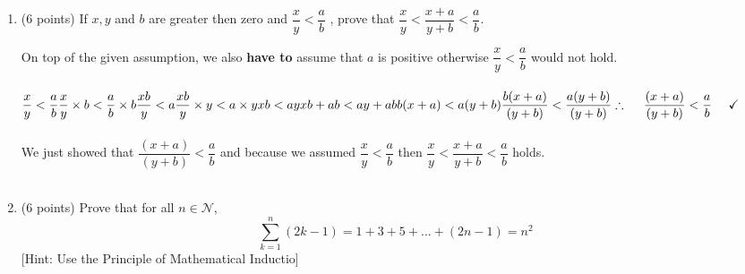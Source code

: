 \documentclass[fleqn]{article}
\begin{document}
  \begin{enumerate}
    \item (6 points)  If $x, y$ and $b$ are greater then zero and $\dfrac{x}{y}<\dfrac{a}{b}$
    , prove that $\dfrac{x}{y} < \dfrac{x+a}{y+b} < \dfrac{a}{b}$.

      \textcolor{hwColor}{
        On top of the given assumption, we also \textbf{have to} assume that $a$ is positive otherwise $\dfrac{x}{y}<\dfrac{a}{b}$ would not hold.
        \\
        \\
        $
          \dfrac{x}{y} < \dfrac{a}{b}
          \\
          \\
          \dfrac{x}{y} \times b < \dfrac{a}{b} \times b
          \\
          \\
          \dfrac{xb}{y} < a
          \\
          \\
          \dfrac{xb}{y} \times y < a \times y
          \\
          \\
          xb < ay 
          \\
          \\
          xb+ab < ay+ab
          \\
          \\
          b(x+a) < a(y+b)
          \\
          \\
          \dfrac{b(x+a)}{(y+b)} < \dfrac{a(y+b)}{(y+b)}
          \\
          \\
          \\
          \therefore ~~~~ \dfrac{(x+a)}{(y+b)} < \dfrac{a}{b} ~~~~ \checkmark
        $
        \\
        \\
        We just showed that $\dfrac{(x+a)}{(y+b)} < \dfrac{a}{b}$ and because we assumed $\dfrac{x}{y}<\dfrac{a}{b}$ then 
        $\dfrac{x}{y} < \dfrac{x+a}{y+b} < \dfrac{a}{b}$ holds.
        \\
        \\
      }

    \item (6 points) Prove that for all $n \in \mathcal{N}$,
    $$
      \sum\limits_{k=1}^{n} (2k-1)=1+3+5+...+(2n-1)=n^2
    $$
    [Hint: Use the Principle of Mathematical Inductio]


\end{enumerate}
\end{document}
